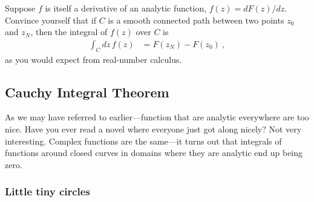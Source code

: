 \begin{exercise}\label{eq:fundamental:theorem:calculus}
Suppose $f$ is itself a derivative of an analytic function, $f(z)=dF(z)/dz$.
Convince yourself that if $C$ is a smooth connected path between two points $z_0$ and $z_N$, then the integral of $f(z)$ over $C$ is
\begin{align}
	\int_C dz\, f(z) &= F(z_N) - F(z_0) \ ,
\end{align}
as you would expect from real-number calculus.
\end{exercise}


 

\subsection{Cauchy Integral Theorem}

As we may have referred to earlier---function that are analytic everywhere are too nice. Have you ever read a novel where everyone just got along nicely? Not very interesting. Complex functions are the same---it turns out that integrals of functions around closed curves in domains where they are analytic end up being zero. 

\subsubsection{Little tiny circles}

